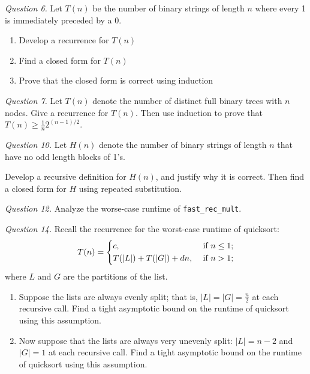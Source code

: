 \documentclass[11pt]{article}
\begin{document}
    \textit{Question 6.} Let \(T(n)\) be the number of binary strings of length \(n\) where every 1 is immediately preceded by a 0.
    \begin{enumerate}[label=(\alph*)]
        \item Develop a recurrence for \(T(n)\)
        \item Find a closed form for \(T(n)\) 
        \item Prove that the closed form is correct using induction
    \end{enumerate}

    \textit{Question 7.} Let \(T(n)\) denote the number of distinct full binary trees with \(n\) nodes. Give a recurrence for \(T(n)\). Then use induction to prove that \(T(n)\geq \frac{1}{n}2^{(n-1) / 2}\).

    \textit{Question 10.} Let \(H(n)\) denote the number of binary strings of length \(n\) that have no odd length blocks of 1's.

    Develop a recursive definition for \(H(n)\), and justify why it is correct. Then find a closed form for \(H\) using repeated substitution.

    \textit{Question 12.} Analyze the worse-case runtime of \verb|fast_rec_mult|.

    \textit{Question 14.} Recall the recurrence for the worst-case runtime of quicksort:
    \[
        T(n)=\begin{dcases}
            c, &\text{ if } n\leq 1;\\
            T(|L|)+T(|G|) + dn, &\text{ if } n>1;\\
        \end{dcases}
    \]
    where \(L\) and \(G\) are the partitions of the list.
    \begin{enumerate}
        \item Suppose the lists are always evenly split; that is, \(|L| = |G| = \frac{n}{2}\) at each recursive call. Find a tight asymptotic bound on the runtime of quicksort using this assumption.
        \item Now suppose that the lists are always very unevenly split: \(|L| = n-2\) and \(|G| = 1\) at each recursive call. Find a tight asymptotic bound on the runtime of quicksort using this assumption.
    \end{enumerate}
\end{document}
